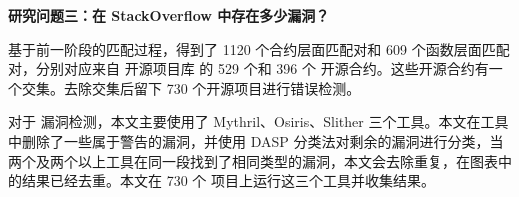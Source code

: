 \textbf{研究问题三：在 StackOverflow 中存在多少漏洞？}

基于前一阶段的匹配过程，得到了 1120 个合约层面匹配对和 609 个函数层面匹配对，分别对应来自 开源项目库 的  529 个和 396 个 开源合约。这些开源合约有一个交集。去除交集后留下 730 个开源项目进行错误检测。



对于 漏洞检测，本文主要使用了 Mythril、Osiris、Slither 三个工具。本文在工具中删除了一些属于警告的漏洞，并使用 DASP 分类法对剩余的漏洞进行分类，当两个及两个以上工具在同一段找到了相同类型的漏洞，本文会去除重复，在图表中的结果已经去重。本文在 730 个 项目上运行这三个工具并收集结果。

